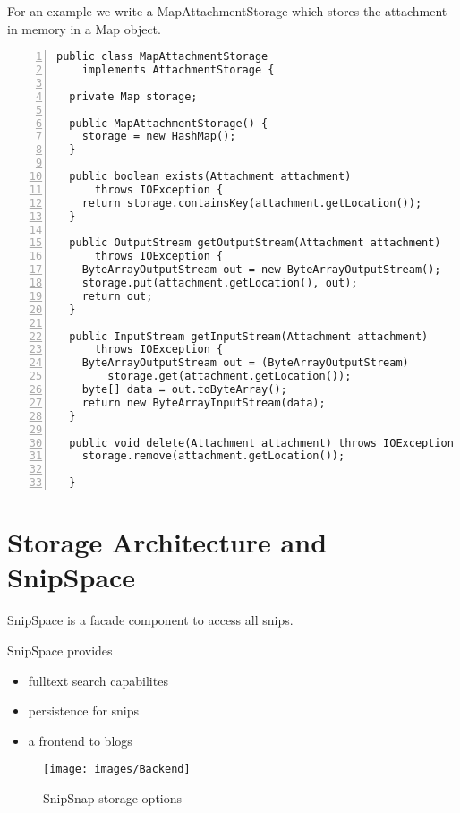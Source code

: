 \documentclass[a4paper,pdftex]{article}
\begin{document}
For an example we write a MapAttachmentStorage which stores the attachment in memory in a Map object.

\begin{Verbatim}[gobble=0,frame=single,numbers=left,fontsize=\small]
public class MapAttachmentStorage
    implements AttachmentStorage {

  private Map storage;

  public MapAttachmentStorage() {
    storage = new HashMap();
  }

  public boolean exists(Attachment attachment)
      throws IOException {
    return storage.containsKey(attachment.getLocation());
  }

  public OutputStream getOutputStream(Attachment attachment)
      throws IOException {
    ByteArrayOutputStream out = new ByteArrayOutputStream();
    storage.put(attachment.getLocation(), out);
    return out;
  }

  public InputStream getInputStream(Attachment attachment)
      throws IOException {
    ByteArrayOutputStream out = (ByteArrayOutputStream)
        storage.get(attachment.getLocation());
    byte[] data = out.toByteArray();
    return new ByteArrayInputStream(data);
  }

  public void delete(Attachment attachment) throws IOException {
    storage.remove(attachment.getLocation());

  }
\end{Verbatim}

\section{Storage Architecture and SnipSpace}

SnipSpace is a facade component to access all snips.

SnipSpace provides
\begin{itemize}
\item fulltext search capabilites
\item persistence for snips
\item a frontend to blogs
\end{itemize}

\begin{figure}[ht]
  \centering
    \texttt{[image: images/Backend]}
     \caption{\small\textsf SnipSnap storage options}
     \label{Backend}
\end{figure}
\end{document}
